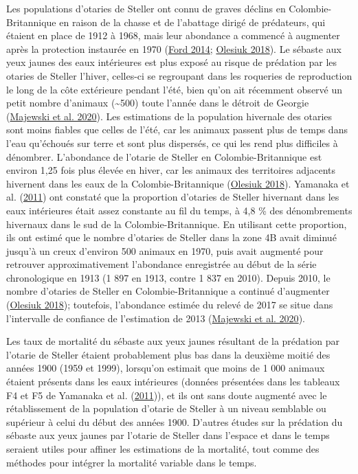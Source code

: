 \documentclass[french,11pt]{book}
\begin{document}
Les populations d'otaries de Steller ont connu de graves déclins en Colombie-Britannique en raison de la chasse et de l'abattage dirigé de prédateurs, qui étaient en place de 1912 à 1968, mais leur abondance a commencé à augmenter après la protection instaurée en 1970 (\protect\hyperlink{ref-ford2014}{Ford 2014}; \protect\hyperlink{ref-olesiuk2018}{Olesiuk 2018}). Le sébaste aux yeux jaunes des eaux intérieures est plus exposé au risque de prédation par les otaries de Steller l'hiver, celles-ci se regroupant dans les roqueries de reproduction le long de la côte extérieure pendant l'été, bien qu'on ait récemment observé un petit nombre d'animaux (\textasciitilde500) toute l'année dans le détroit de Georgie (\protect\hyperlink{ref-majewski2020}{Majewski et al. 2020}). Les estimations de la population hivernale des otaries sont moins fiables que celles de l'été, car les animaux passent plus de temps dans l'eau qu'échoués sur terre et sont plus dispersés, ce qui les rend plus difficiles à dénombrer. L'abondance de l'otarie de Steller en Colombie-Britannique est environ 1,25 fois plus élevée en hiver, car les animaux des territoires adjacents hivernent dans les eaux de la Colombie-Britannique (\protect\hyperlink{ref-olesiuk2018}{Olesiuk 2018}). Yamanaka et al. (\protect\hyperlink{ref-yamanaka2011}{2011}) ont constaté que la proportion d'otaries de Steller hivernant dans les eaux intérieures était assez constante au fil du temps, à 4,8 \% des dénombrements hivernaux dans le sud de la Colombie-Britannique. En utilisant cette proportion, ils ont estimé que le nombre d'otaries de Steller dans la zone 4B avait diminué jusqu'à un creux d'environ 500 animaux en 1970, puis avait augmenté pour retrouver approximativement l'abondance enregistrée au début de la série chronologique en 1913 (1 897 en 1913, contre 1 837 en 2010). Depuis 2010, le nombre d'otaries de Steller en Colombie-Britannique a continué d'augmenter (\protect\hyperlink{ref-olesiuk2018}{Olesiuk 2018}); toutefois, l'abondance estimée du relevé de 2017 se situe dans l'intervalle de confiance de l'estimation de 2013 (\protect\hyperlink{ref-majewski2020}{Majewski et al. 2020}).

Les taux de mortalité du sébaste aux yeux jaunes résultant de la prédation par l'otarie de Steller étaient probablement plus bas dans la deuxième moitié des années 1900 (1959 et 1999), lorsqu'on estimait que moins de 1 000 animaux étaient présents dans les eaux intérieures (données présentées dans les tableaux F4 et F5 de Yamanaka et al. (\protect\hyperlink{ref-yamanaka2011}{2011})), et ils ont sans doute augmenté avec le rétablissement de la population d'otarie de Steller à un niveau semblable ou supérieur à celui du début des années 1900. D'autres études sur la prédation du sébaste aux yeux jaunes par l'otarie de Steller dans l'espace et dans le temps seraient utiles pour affiner les estimations de la mortalité, tout comme des méthodes pour intégrer la mortalité variable dans le temps.
\end{document}
